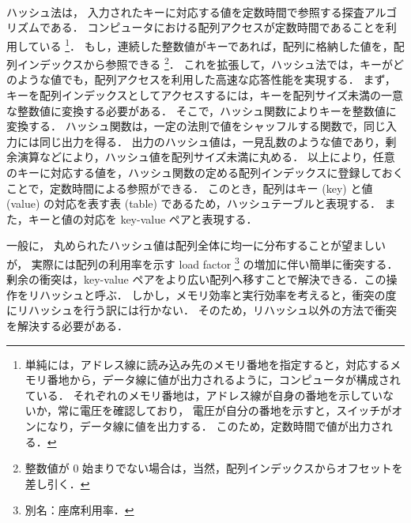\thispagestyle{empty} %

　\\
\\
\\
\\
\\
\\
\\
\\

ハッシュ法は，
入力されたキーに対応する値を定数時間で参照する探査アルゴリズムである．
コンピュータにおける配列アクセスが定数時間であることを利用している
\footnote{
単純には，アドレス線に読み込み先のメモリ番地を指定すると，対応するメモリ番地から，データ線に値が出力されるように，コンピュータが構成されている．
それぞれのメモリ番地は，アドレス線が自身の番地を示していないか，常に電圧を確認しており，
電圧が自分の番地を示すと，スイッチがオンになり，データ線に値を出力する．
このため，定数時間で値が出力される．
}．
もし，連続した整数値がキーであれば，配列に格納した値を，配列インデックスから参照できる
\footnote{
整数値が 0 始まりでない場合は，当然，配列インデックスからオフセットを差し引く．
}．
これを拡張して，ハッシュ法では，キーがどのような値でも，配列アクセスを利用した高速な応答性能を実現する．
まず，キーを配列インデックスとしてアクセスするには，キーを配列サイズ未満の一意な整数値に変換する必要がある．
そこで，ハッシュ関数によりキーを整数値に変換する．
ハッシュ関数は，一定の法則で値をシャッフルする関数で，同じ入力には同じ出力を得る．
出力のハッシュ値は，一見乱数のような値であり，剰余演算などにより，ハッシュ値を配列サイズ未満に丸める．
以上により，任意のキーに対応する値を，ハッシュ関数の定める配列インデックスに登録しておくことで，定数時間による参照ができる．
このとき，配列はキー (key) と値 (value) の対応を表す表 (table) であるため，ハッシュテーブルと表現する．
また，キーと値の対応を key-value ペアと表現する．

一般に，
丸められたハッシュ値は配列全体に均一に分布することが望ましいが，
実際には配列の利用率を示す load factor \footnote{別名：座席利用率．} の増加に伴い簡単に衝突する．
剰余の衝突は，key-value ペアをより広い配列へ移すことで解決できる．この操作をリハッシュと呼ぶ．
しかし，メモリ効率と実行効率を考えると，衝突の度にリハッシュを行う訳には行かない．
そのため，リハッシュ以外の方法で衝突を解決する必要がある．

